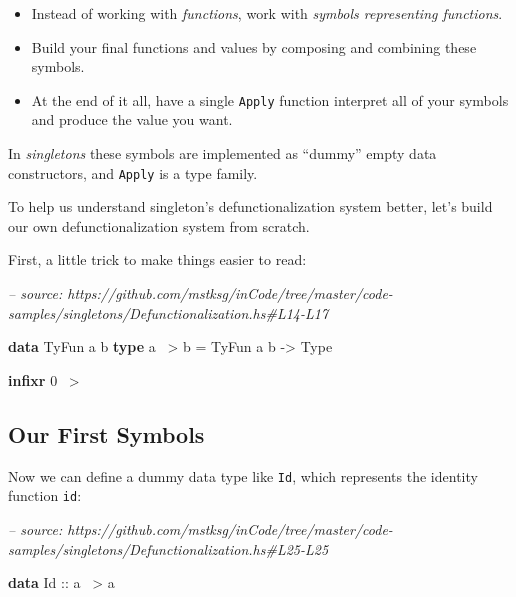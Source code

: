 \documentclass[]{article}
\newenvironment{Shaded}{}{}
\newcommand{\CommentTok}[1]{\textcolor[rgb]{0.38,0.63,0.69}{\textit{#1}}}
\newcommand{\DataTypeTok}[1]{\textcolor[rgb]{0.56,0.13,0.00}{#1}}
\newcommand{\DecValTok}[1]{\textcolor[rgb]{0.25,0.63,0.44}{#1}}
\newcommand{\FunctionTok}[1]{\textcolor[rgb]{0.02,0.16,0.49}{#1}}
\newcommand{\KeywordTok}[1]{\textcolor[rgb]{0.00,0.44,0.13}{\textbf{#1}}}
\newcommand{\NormalTok}[1]{#1}
\newcommand{\OtherTok}[1]{\textcolor[rgb]{0.00,0.44,0.13}{#1}}
\begin{document}
\begin{itemize}
\tightlist
\item
  Instead of working with \emph{functions}, work with \emph{symbols representing
  functions}.
\item
  Build your final functions and values by composing and combining these
  symbols.
\item
  At the end of it all, have a single \texttt{Apply} function interpret all of
  your symbols and produce the value you want.
\end{itemize}

In \emph{singletons} these symbols are implemented as ``dummy'' empty data
constructors, and \texttt{Apply} is a type family.

To help us understand singleton's defunctionalization system better, let's build
our own defunctionalization system from scratch.

First, a little trick to make things easier to read:

\begin{Shaded}
\begin{Highlighting}[]
\CommentTok{-- source: https://github.com/mstksg/inCode/tree/master/code-samples/singletons/Defunctionalization.hs#L14-L17}

\KeywordTok{data} \DataTypeTok{TyFun}\NormalTok{ a b}
\KeywordTok{type}\NormalTok{ a }\FunctionTok{~>}\NormalTok{ b }\FunctionTok{=} \DataTypeTok{TyFun}\NormalTok{ a b }\OtherTok{->} \DataTypeTok{Type}

\KeywordTok{infixr} \DecValTok{0} \FunctionTok{~>}
\end{Highlighting}
\end{Shaded}

\hypertarget{our-first-symbols}{%
\subsection{Our First Symbols}\label{our-first-symbols}}

Now we can define a dummy data type like \texttt{Id}, which represents the
identity function \texttt{id}:

\begin{Shaded}
\begin{Highlighting}[]
\CommentTok{-- source: https://github.com/mstksg/inCode/tree/master/code-samples/singletons/Defunctionalization.hs#L25-L25}

\KeywordTok{data} \DataTypeTok{Id}\OtherTok{ ::}\NormalTok{ a }\FunctionTok{~>}\NormalTok{ a}
\end{Highlighting}
\end{Shaded}
\end{document}
